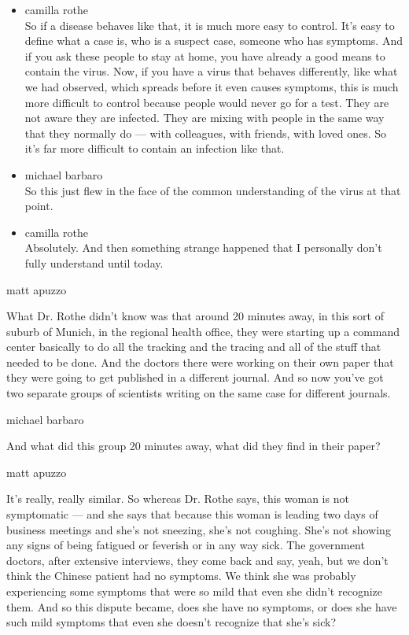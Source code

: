 \begin{itemize}
\item
  camilla rothe\\
  So if a disease behaves like that, it is much more easy to control.
  It's easy to define what a case is, who is a suspect case, someone who
  has symptoms. And if you ask these people to stay at home, you have
  already a good means to contain the virus. Now, if you have a virus
  that behaves differently, like what we had observed, which spreads
  before it even causes symptoms, this is much more difficult to control
  because people would never go for a test. They are not aware they are
  infected. They are mixing with people in the same way that they
  normally do --- with colleagues, with friends, with loved ones. So
  it's far more difficult to contain an infection like that.
\item
  michael barbaro\\
  So this just flew in the face of the common understanding of the virus
  at that point.
\item
  camilla rothe\\
  Absolutely. And then something strange happened that I personally
  don't fully understand until today.
\end{itemize}

matt apuzzo

What Dr. Rothe didn't know was that around 20 minutes away, in this sort
of suburb of Munich, in the regional health office, they were starting
up a command center basically to do all the tracking and the tracing and
all of the stuff that needed to be done. And the doctors there were
working on their own paper that they were going to get published in a
different journal. And so now you've got two separate groups of
scientists writing on the same case for different journals.

michael barbaro

And what did this group 20 minutes away, what did they find in their
paper?

matt apuzzo

It's really, really similar. So whereas Dr. Rothe says, this woman is
not symptomatic --- and she says that because this woman is leading two
days of business meetings and she's not sneezing, she's not coughing.
She's not showing any signs of being fatigued or feverish or in any way
sick. The government doctors, after extensive interviews, they come back
and say, yeah, but we don't think the Chinese patient had no symptoms.
We think she was probably experiencing some symptoms that were so mild
that even she didn't recognize them. And so this dispute became, does
she have no symptoms, or does she have such mild symptoms that even she
doesn't recognize that she's sick?


